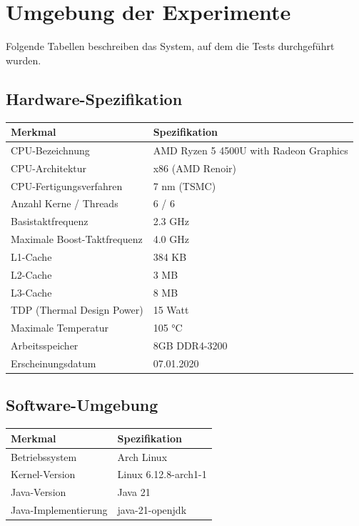 \documentclass[12pt]{article}
\date{}
\begin{document}
	
\section*{Umgebung der Experimente}
Folgende Tabellen beschreiben das System, auf dem die Tests durchgeführt wurden.
\subsection*{Hardware-Spezifikation}
\begin{table}[h]
	\centering
	\begin{tabular}{|l|l|}
		\hline
		\textbf{Merkmal} & \textbf{Spezifikation} \\
		\hline
		CPU-Bezeichnung & AMD Ryzen 5 4500U with Radeon Graphics\\
		CPU-Architektur & x86 (AMD Renoir) \\
		CPU-Fertigungsverfahren & 7 nm (TSMC) \\
		\hline
		Anzahl Kerne / Threads & 6 / 6 \\
		Basistaktfrequenz & 2.3 GHz \\
		Maximale Boost-Taktfrequenz & 4.0 GHz \\
		\hline
		L1-Cache & 384 KB \\
		L2-Cache & 3 MB \\
		L3-Cache & 8 MB \\
		\hline
		TDP (Thermal Design Power) & 15 Watt \\
		Maximale Temperatur & 105 °C \\
		\hline
		Arbeitsspeicher & 8GB DDR4-3200 \\
		\hline
		Erscheinungsdatum & 07.01.2020 \\
		\hline
	\end{tabular}
\end{table}

\subsection*{Software-Umgebung}
\begin{table}[h]
	\centering
	\begin{tabular}{|l|l|}
		\hline
		\textbf{Merkmal} & \textbf{Spezifikation} \\
		\hline
		Betriebssystem & Arch Linux\\
		Kernel-Version & Linux 6.12.8-arch1-1\\
		\hline
		Java-Version & Java 21\\
		Java-Implementierung & java-21-openjdk\\
		\hline
	\end{tabular}
\end{table}
\end{document}
